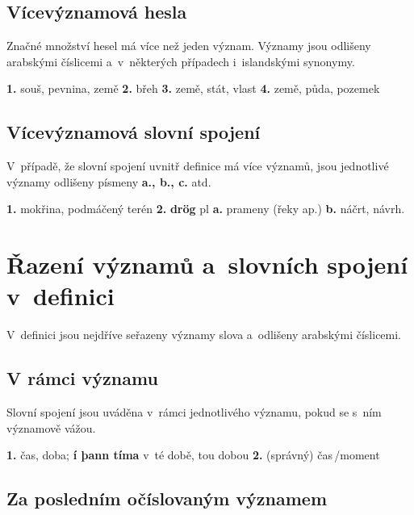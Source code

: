 \subsection*{Vícevýznamová hesla}

Značné množství hesel má více než jeden význam. Významy jsou odlišeny arabskými číslicemi a~v~některých případech i~islandskými synonymy.

\blspace
  \dicEntry {}   {\textbf{1.}}  {souš, pevnina, země} {\textbf{2.}}  {břeh} {\textbf{3.}}  {země, stát, vlast} {\textbf{4.}}  {země, půda, pozemek}
\blspace

\subsection*{Vícevýznamová slovní spojení}

V~případě, že slovní spojení uvnitř definice má více významů, jsou jednotlivé významy odlišeny písmeny {\textbf{a., b., c.}} atd.

\blspace
  \dicEntry {} {  {\textbf{1.}} {mokřina, podmáčený terén} {\textbf{2.}} \textbf{drög} {\footnotesize{pl}} {\textbf{a.}}  {prameny (řeky ap.)} {\textbf{b.}}  {náčrt, návrh.}}
\blspace

\section{Řazení významů a~slovních spojení v~definici}
\longsectionskip

V~definici jsou nejdříve seřazeny významy slova a~odlišeny arabskými číslicemi.

\subsection*{V rámci významu}

Slovní spojení jsou uváděna v~rámci jednotlivého významu, pokud se s~ním významově vážou.

\blspace
  \dicEntry {}   {\textbf{1.}}  {čas, doba}; \textbf{í þann tíma}   {v~té době, tou dobou} {\textbf{2.}}  {(správný) čas\,/\addthin moment}
\blspace

\subsection*{Za posledním očíslovaným významem}

